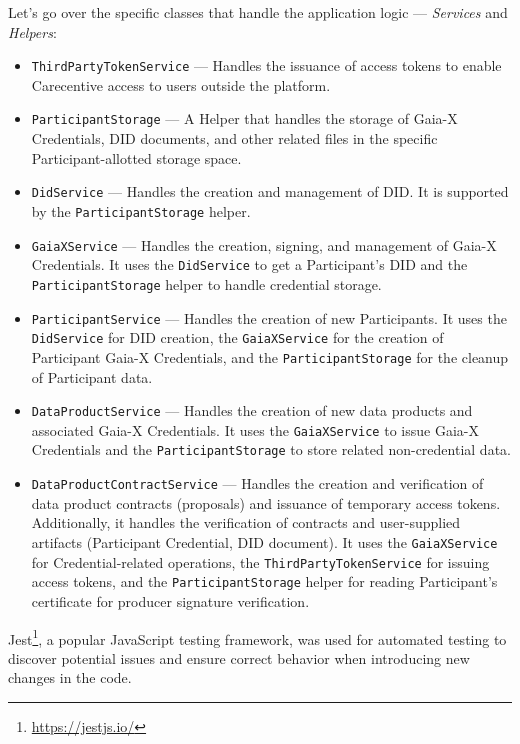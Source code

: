 Let's go over the specific classes that handle the application logic --- \textit{Services} and \textit{Helpers}:
\begin{itemize}
    \item \texttt{ThirdPartyTokenService} --- Handles the issuance of access tokens to enable Carecentive access to users outside the platform.
    \item \texttt{ParticipantStorage} --- A Helper that handles the storage of Gaia-X Credentials, DID documents, and other related files in the specific Participant-allotted storage space.
    \item \texttt{DidService} --- Handles the creation and management of DID.
    It is supported by the \texttt{ParticipantStorage} helper.
    \item \texttt{GaiaXService} --- Handles the creation, signing, and management of Gaia-X Credentials.
    It uses the \texttt{DidService} to get a Participant's DID and the \texttt{ParticipantStorage} helper to handle credential storage.
    \item \texttt{ParticipantService} --- Handles the creation of new Participants.
    It uses the \texttt{DidService} for DID creation, the \texttt{GaiaXService} for the creation of Participant Gaia-X Credentials, and the \texttt{ParticipantStorage} for the cleanup of Participant data.
    \item \texttt{DataProductService} --- Handles the creation of new data products and associated Gaia-X Credentials.
    It uses the \texttt{GaiaXService} to issue Gaia-X Credentials and the \texttt{ParticipantStorage} to store related non-credential data.
    \item \texttt{DataProductContractService} --- Handles the creation and verification of data product contracts (proposals) and issuance of temporary access tokens.
    Additionally, it handles the verification of contracts and user-supplied artifacts (Participant Credential, DID document).
    It uses the \texttt{GaiaXService} for Credential-related operations, the \texttt{ThirdPartyTokenService} for issuing access tokens, and the \texttt{ParticipantStorage} helper for reading Participant's certificate for producer signature verification.
\end{itemize}

Jest\footnote{\url{https://jestjs.io/}}, a popular JavaScript testing framework, was used for automated testing to discover potential issues and ensure correct behavior when introducing new changes in the code.

